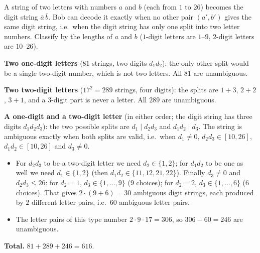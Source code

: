 A string of two letters with numbers $a$ and $b$ (each from $1$ to $26$) becomes the digit string $\overline{a}\,\overline{b}$. Bob can decode it exactly when no other pair $(a',b')$ gives the same digit string, i.e.\ when the digit string has only one split into two letter numbers. Classify by the lengths of $a$ and $b$ ($1$-digit letters are $1$--$9$, $2$-digit letters are $10$--$26$).

\textbf{Two one-digit letters} ($81$ strings, two digits $d_1d_2$): the only other split would be a single two-digit number, which is not two letters. All $81$ are unambiguous.

\textbf{Two two-digit letters} ($17^2=289$ strings, four digits): the splits are $1+3$, $2+2$, $3+1$, and a $3$-digit part is never a letter. All $289$ are unambiguous.

\textbf{A one-digit and a two-digit letter} (in either order; the digit string has three digits $d_1d_2d_3$): the two possible splits are $d_1\mid d_2d_3$ and $d_1d_2\mid d_3$. The string is ambiguous exactly when both splits are valid, i.e.\ when $d_1\ne0$, $d_2d_3\in[10,26]$, $d_1d_2\in[10,26]$ and $d_3\ne0$.
\begin{itemize}
\item For $d_2d_3$ to be a two-digit letter we need $d_2\in\{1,2\}$; for $d_1d_2$ to be one as well we need $d_1\in\{1,2\}$ (then $d_1d_2\in\{11,12,21,22\}$). Finally $d_3\ne0$ and $d_2d_3\le26$: for $d_2=1$, $d_3\in\{1,\dots,9\}$ ($9$ choices); for $d_2=2$, $d_3\in\{1,\dots,6\}$ ($6$ choices). That gives $2\cdot(9+6)=30$ ambiguous digit strings, each produced by $2$ different letter pairs, i.e.\ $60$ ambiguous letter pairs.
\item The letter pairs of this type number $2\cdot9\cdot17=306$, so $306-60=246$ are unambiguous.
\end{itemize}

\textbf{Total.} $81+289+246=\boxed{616}$.
